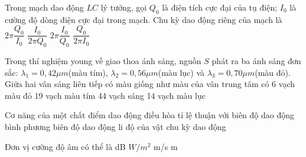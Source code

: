 \documentclass[11pt,a4paper]{book}
\begin{document}
								\begin{ex} 
									
								 \end{ex} 
								\begin{ex} 
									Trong mạch dao động $LC$ lý tưởng, gọi ${{Q}_0}$ là điện tích cực đại của tụ điện; ${{I}_0}$ là cường độ dòng điện cực đại trong mạch. Chu kỳ dao động riêng của mạch là
									\choice 
									{ $2\pi \dfrac{{{Q}_0}}{{{I}_0}}$}
									{$\dfrac{{{I}_0}}{2\pi {{Q}_0}}$}
									{ $2\pi \dfrac{{{I}_0}}{{{Q}_0}}$}
									{ $\dfrac{{{Q}_0}}{2\pi {{I}_0}}$} \end{ex} 
								\begin{ex} 
									Trong thí nghiệm young về giao thoa ánh sáng, nguồn $S$ phát ra ba ánh sáng đơn sắc: ${{\lambda }_{1}}=0,42\mu m$(màu tím), ${{\lambda }_{2}}=0,56\mu m$(màu lục) và ${{\lambda }_{3}}=0,70\mu m$(màu đỏ). Giữa hai vân sáng liên tiếp có màu giống như màu của vân trung tâm có
									\choice 
									{ 6 vạch màu đỏ}
									{ 19 vạch màu tím}
									{ 44 vạch sáng}
									{ 14 vạch màu lục} \end{ex} 
								\begin{ex} 
									Cơ năng của một chất điểm dao động điều hòa tỉ lệ thuận với
									\choice 
									{ biên độ dao động}
									{ bình phương biên độ dao động} 
									{ li độ của vật}
									{ chu kỳ dao động} \end{ex} 
								\begin{ex} 
									Đơn vị cường độ	 âm có thể là
									\choice 
									{ dB}
									{ $W/{{m}^2}$}
									{ m/s}
									{ m} \end{ex} 
\end{document}
